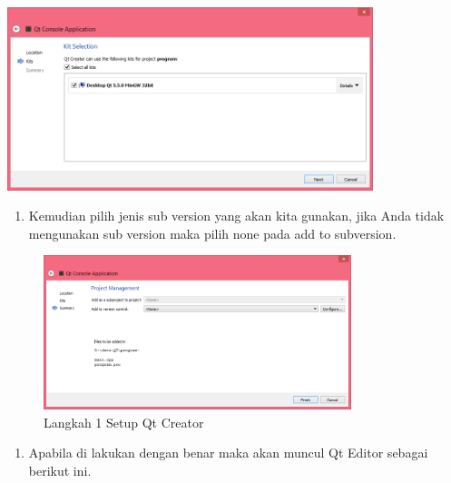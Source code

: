 \begin{center}

\includegraphics[width=0.8\textwidth]{images/qt-console-aplication-3.png}

\end{center}

\begin{enumerate}
\def\labelenumi{\arabic{enumi}.}
\setcounter{enumi}{3}
\tightlist
\item
  Kemudian pilih jenis sub version yang akan kita gunakan, jika Anda
  tidak mengunakan sub version maka pilih none pada add to subversion.
\end{enumerate}

\begin{figure}[htbp]
\centering
\includegraphics[width=0.8\textwidth]{images/qt-console-aplication-4.png}
\caption{Langkah 1 Setup Qt Creator }
\end{figure}

\begin{enumerate}
\def\labelenumi{\arabic{enumi}.}
\setcounter{enumi}{4}
\tightlist
\item
  Apabila di lakukan dengan benar maka akan muncul Qt Editor sebagai
  berikut ini.
\end{enumerate}

